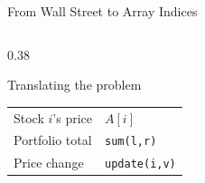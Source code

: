 \documentclass[10pt,aspectratio=169]{beamer}
\begin{document}
\begin{frame}{From Wall Street to Array Indices}
\vspace{-0.1cm}
\begin{columns}[T]
\begin{column}{0.38\textwidth}
\small
\begin{block}{Translating the problem}
\begin{tabular}{@{}ll@{}}
Stock $i$'s price & $A[i]$ \\
Portfolio total & \texttt{sum(l,r)} \\
Price change & \texttt{update(i,v)} \\
\end{tabular}
\end{block}
\vspace{0.3cm}
\end{column}


\end{columns}
\end{frame}
\end{document}
